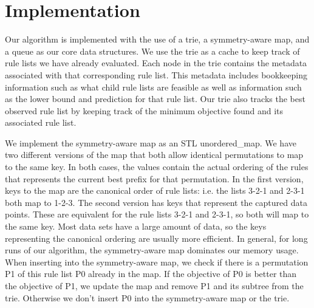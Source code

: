 \documentclass[sigconf]{acmart}
\begin{document}



\maketitle



\section{Implementation}

Our algorithm is implemented with the use of a trie, a symmetry-aware map, and a queue as our core data structures. We use the trie as a cache to keep track of rule lists we have already evaluated. Each node in the trie contains the metadata associated with that corresponding rule list. This metadata includes bookkeeping information such as what child rule lists are feasible as well as information such as the lower bound and prediction for that rule list. Our trie also tracks the best observed rule list by keeping track of the minimum objective found and its associated rule list.

We implement the symmetry-aware map as an STL unordered\_map. We have two different versions of the map that both allow identical permutations to map to the same key. In both cases, the values contain the actual ordering of the rules that represents the current best prefix for that permutation. In the first version, keys to the map are the canonical order of rule lists: i.e. the lists 3-2-1 and 2-3-1 both map to 1-2-3. The second version has keys that represent the captured data points. These are equivalent for the rule lists 3-2-1 and 2-3-1, so both will map to the same key. Most data sets have a large amount of data, so the keys representing the canonical ordering are usually more efficient. In general, for long runs of our algorithm, the symmetry-aware map dominates our memory usage. When inserting into the symmetry-aware map, we check if there is a permutation P1 of this rule list P0 already in the map. If the objective of P0 is better than the objective of P1, we update the map and remove P1 and its subtree from the trie. Otherwise we don't insert P0 into the symmetry-aware map or the trie.
\end{document}

